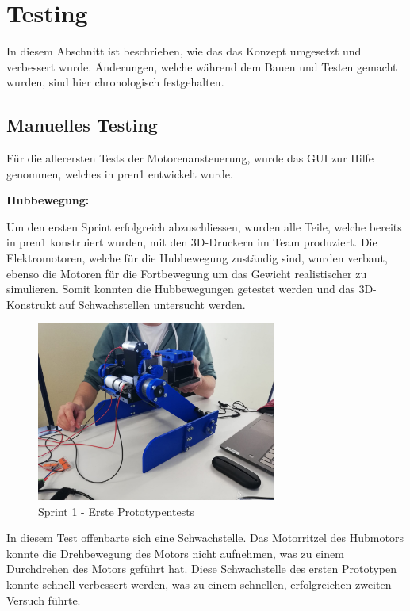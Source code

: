 \newpage

\section{Testing}

In diesem Abschnitt ist beschrieben, wie das das Konzept umgesetzt und verbessert wurde. Änderungen, welche während dem Bauen und Testen gemacht wurden, sind hier chronologisch festgehalten. 

\subsection{Manuelles Testing}
Für die allerersten Tests der Motorenansteuerung, wurde das GUI zur Hilfe genommen, welches in \acrshort{pren1} entwickelt wurde.

\textbf{Hubbewegung:}

Um den ersten Sprint erfolgreich abzuschliessen, wurden alle Teile, welche bereits in \acrshort{pren1} konstruiert wurden, mit den 3D-Druckern im Team produziert. Die Elektromotoren, welche für die Hubbewegung zuständig sind, wurden verbaut, ebenso die Motoren für die Fortbewegung um das Gewicht realistischer zu simulieren. Somit konnten die Hubbewegungen getestet werden und das 3D-Konstrukt auf Schwachstellen untersucht werden.

\begin{figure}[H]
  \includegraphics[width=0.7\textwidth]{img/Sprint1/pren1_sprint1_1.png}
  \centering
  \caption{Sprint 1 - Erste Prototypentests}
  \label{fig:erstePrototypentests}
\end{figure}

\newpage

In diesem Test offenbarte sich eine Schwachstelle. Das Motorritzel des Hubmotors konnte die Drehbewegung des Motors nicht aufnehmen, was zu einem Durchdrehen des Motors geführt hat.
Diese Schwachstelle des ersten Prototypen konnte schnell verbessert  werden, was zu einem schnellen, erfolgreichen zweiten Versuch führte.


